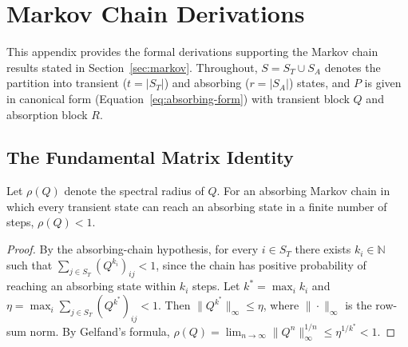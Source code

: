 %


\chapter{Markov Chain Derivations}
\label{app:G}

This appendix provides the formal derivations supporting the Markov chain
results stated in Section~\ref{sec:markov}. Throughout, $S = S_T \cup S_A$
denotes the partition into transient ($t = |S_T|$) and absorbing
($r = |S_A|$) states, and $P$ is given in canonical form
(Equation~\ref{eq:absorbing-form}) with transient block $Q$ and absorption
block $R$.


\section{The Fundamental Matrix Identity}
\label{app:G-fundamental}

\begin{lemma}
\label{lem:spectral-radius}
Let $\rho(Q)$ denote the spectral radius of $Q$. For an absorbing Markov
chain in which every transient state can reach an absorbing state in a
finite number of steps, $\rho(Q) < 1$.
\end{lemma}

\begin{proof}
By the absorbing-chain hypothesis, for every $i \in S_T$ there exists
$k_i \in \mathbb{N}$ such that $\sum_{j \in S_T} (Q^{k_i})_{ij} < 1$, since
the chain has positive probability of reaching an absorbing state within
$k_i$ steps. Let $k^* = \max_i k_i$ and
$\eta = \max_i \sum_{j \in S_T} (Q^{k^*})_{ij} < 1$. Then
$\| Q^{k^*} \|_\infty \leq \eta$, where $\|\cdot\|_\infty$ is the row-sum
norm. By Gelfand's formula, $\rho(Q) = \lim_{n \to \infty}
\| Q^n \|_\infty^{1/n} \leq \eta^{1/k^*} < 1$.
\end{proof}

